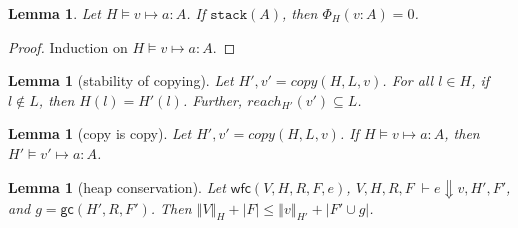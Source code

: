 \documentclass[11pt]{article}
\newcommand{\irl}[1]{\mathtt{#1}}
\newcommand{\stack}[1]{\irl{stack}(#1)}
\newcommand{\ssize}[2]{\left\Vert #2 \right\Vert_{#1}}
\newcommand{\gc}[3]{\mathsf{gc}(#1,#2,#3)}
\newcommand{\wfc}[5]{\mathsf{wfc}(#1,#2,#3,#4,#5)}
\newtheorem{lemma}[theorem]{Lemma}
\theoremstyle{definition}
\begin{document}
\begin{lemma}\label{itm:stack}
Let $H \vDash v \mapsto a : A$. If $\stack{A}$, then $\Phi_H(v:A) = 0$.
\end{lemma}

\begin{proof}
Induction on $H \vDash v \mapsto a : A$.
\end{proof}


\begin{lemma}[stability of copying]
	Let $H',v' = copy(H,L,v)$. For all $l \in H$, if $l \notin L$, then $H(l) = H'(l)$. 
	Further, $reach_{H'}(v') \subseteq L$.
\end{lemma}

\begin{lemma}[copy is copy]
	Let $H',v' = copy(H,L,v)$. If $H \vDash v \mapsto a : A$, then $H' \vDash v' \mapsto a : A$.
\end{lemma}

\begin{lemma}[heap conservation]
Let $\wfc{V}{H}{R}{F}{e}$, $V,H,R,F \; \vdash e \Downarrow v, H', F'$, and $g = \gc{H'}{R}{F'}$. 
Then $\ssize{H}{V} + |F| \le \ssize{H'}{v} + |F' \cup g|$.
\end{lemma}
\end{document}
